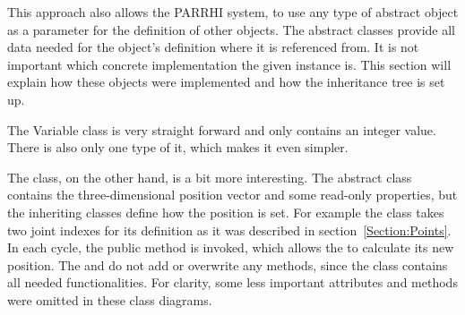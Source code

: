 This approach also allows the PARRHI system, to use any type of abstract object as a parameter for the definition of other objects. The abstract classes provide all data needed for the object's definition where it is referenced from. It is not important which concrete implementation the given instance is. This section will explain how these objects were implemented and how the inheritance tree is set up.

The Variable class is very straight forward and only contains an integer value. There is also only one type of it, which makes it even simpler. 

The  class, on the other hand, is a bit more interesting. The abstract  class contains the three-dimensional position vector and some read-only properties, but the inheriting classes define how the position is set. For example the  class takes two joint indexes for its definition as it was described in section~\ref{Section:Points}. In each cycle, the public method  is invoked, which allows the  to calculate its new position. The  and  do not add or overwrite any methods, since the  class contains all needed functionalities. For clarity, some less important attributes and methods were omitted in these class diagrams.


